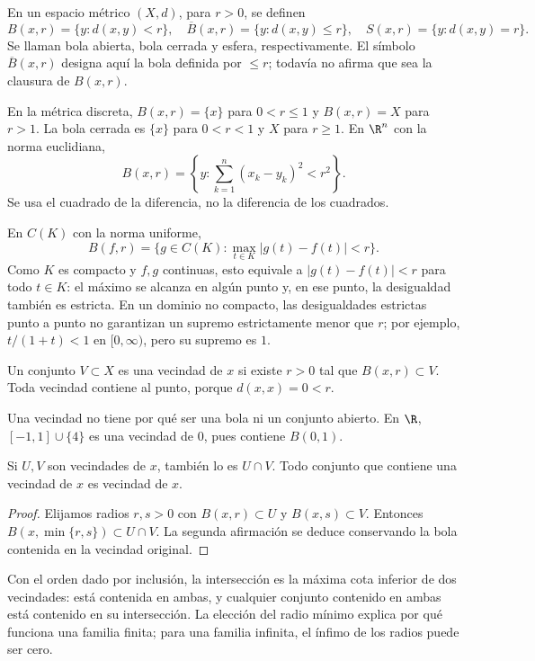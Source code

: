 \begin{definicion}\label{ch02:bolas}
En un espacio métrico $(X,d)$, para $r>0$, se definen
\[
B(x,r)=\{y:d(x,y)<r\},\quad
\overline B(x,r)=\{y:d(x,y)\le r\},\quad
S(x,r)=\{y:d(x,y)=r\}.
\]
Se llaman bola abierta, bola cerrada y esfera, respectivamente. El símbolo $\overline B(x,r)$ designa aquí la bola definida por $\le r$; todavía no afirma que sea la clausura de $B(x,r)$.
\end{definicion}
En la métrica discreta, $B(x,r)=\{x\}$ para $0<r\le1$ y $B(x,r)=X$ para $r>1$. La bola cerrada es $\{x\}$ para $0<r<1$ y $X$ para $r\ge1$. En $\R^n$ con la norma euclidiana,
\[
B(x,r)=\left\{y:\sum_{k=1}^n(x_k-y_k)^2<r^2\right\}.
\]
Se usa el cuadrado de la diferencia, no la diferencia de los cuadrados.

En $C(K)$ con la norma uniforme,
\[
B(f,r)=\{g\in C(K):\max_{t\in K}|g(t)-f(t)|<r\}.
\]
Como $K$ es compacto y $f,g$ continuas, esto equivale a $|g(t)-f(t)|<r$ para todo $t\in K$: el máximo se alcanza en algún punto y, en ese punto, la desigualdad también es estricta. En un dominio no compacto, las desigualdades estrictas punto a punto no garantizan un supremo estrictamente menor que $r$; por ejemplo, $t/(1+t)<1$ en $[0,\infty)$, pero su supremo es $1$.

\begin{definicion}\label{ch02:vecindad}
Un conjunto $V\subset X$ es una vecindad de $x$ si existe $r>0$ tal que $B(x,r)\subset V$. Toda vecindad contiene al punto, porque $d(x,x)=0<r$.
\end{definicion}
Una vecindad no tiene por qué ser una bola ni un conjunto abierto. En $\R$, $[-1,1]\cup\{4\}$ es una vecindad de $0$, pues contiene $B(0,1)$.

\begin{proposicion}\label{ch02:vecindades}
Si $U,V$ son vecindades de $x$, también lo es $U\cap V$. Todo conjunto que contiene una vecindad de $x$ es vecindad de $x$.
\end{proposicion}
\begin{proof}
Elijamos radios $r,s>0$ con $B(x,r)\subset U$ y $B(x,s)\subset V$. Entonces $B(x,\min\{r,s\})\subset U\cap V$. La segunda afirmación se deduce conservando la bola contenida en la vecindad original.
\end{proof}
Con el orden dado por inclusión, la intersección es la máxima cota inferior de dos vecindades: está contenida en ambas, y cualquier conjunto contenido en ambas está contenido en su intersección. La elección del radio mínimo explica por qué funciona una familia finita; para una familia infinita, el ínfimo de los radios puede ser cero.

